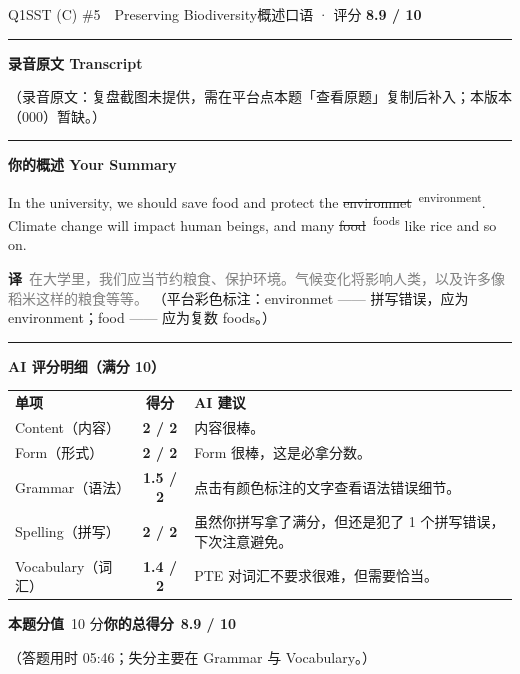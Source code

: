 \documentclass[11pt]{article}
\newcommand{\fix}[2]{%
  \colorbox{cWrongBg}{\textcolor{cWrong}{\sout{#1}}}%
  \,\textsuperscript{\textcolor{cFix}{\footnotesize #2}}}
\newcommand{\sfull}[1]{\textcolor{cFix}{\bfseries #1}}     %
\newcommand{\spart}[1]{\textcolor{cPartial}{\bfseries #1}} %
\newcommand{\ptesub}[1]{%
  \par\needspace{2\baselineskip}\smallskip
  {\color{cAccent}\rule[-0.2ex]{3pt}{1.05em}}\hspace{6pt}%
  {\bfseries\color{cHead}#1}\par\nopagebreak\smallskip}
\newcommand{\zh}[1]{{\footnotesize\textcolor{cNote}{\textbf{译}}\ \textcolor{gray}{#1}}}
\begin{document}
\begin{qblock}{Q1\quad SST (C) \#5\ \ Preserving Biodiversity}{概述口语 · 评分 \textcolor{cAccent}{\bfseries 8.9 / 10}}
\ptesub{录音原文 Transcript}
\begin{promptbox}
{\color{cWrong}（录音原文：复盘截图未提供，需在平台点本题「查看原题」复制后补入；本版本（000）暂缺。）}
\end{promptbox}
\ptesub{你的概述 Your Summary}
\begin{youbox}
In the university, we should save food and protect the \fix{environmet}{environment}. Climate change will impact human beings, and many \fix{food}{foods} like rice and so on.
\end{youbox}
\zh{在大学里，我们应当节约粮食、保护环境。气候变化将影响人类，以及许多像稻米这样的粮食等等。}
{\footnotesize\color{gray}（平台彩色标注：environmet —— 拼写错误，应为 environment；food —— 应为复数 foods。）}
\ptesub{AI 评分明细（满分 10）}
\begin{notebox}
{\renewcommand{\arraystretch}{1.35}
\begin{tabularx}{\linewidth}{@{}l c Z@{}}
\textbf{单项} & \textbf{得分} & \textbf{AI 建议}\\[2pt]
Content（内容）& \sfull{2 / 2} & 内容很棒。\\
Form（形式）& \sfull{2 / 2} & Form 很棒，这是必拿分数。\\
Grammar（语法）& \spart{1.5 / 2} & 点击有颜色标注的文字查看语法错误细节。\\
Spelling（拼写）& \sfull{2 / 2} & 虽然你拼写拿了满分，但还是犯了 1 个拼写错误，下次注意避免。\\
Vocabulary（词汇）& \spart{1.4 / 2} & PTE 对词汇不要求很难，但需要恰当。\\
\end{tabularx}}
\smallskip
\textbf{本题分值}\ 10 分\qquad\textbf{你的总得分}\ \textcolor{cAccent}{\bfseries 8.9 / 10}
\end{notebox}
\smallskip
{\footnotesize\color{gray}（答题用时 05:46；失分主要在 Grammar 与 Vocabulary。）}
\end{qblock}
\end{document}
